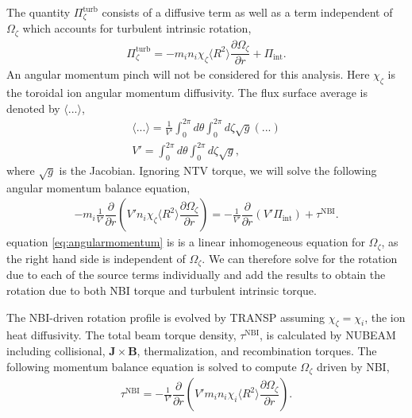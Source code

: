 \documentclass[aip, pop, preprint]{revtex4-1}
\numberwithin{figure}{section}
\numberwithin{equation}{section}
\newcommand{\partder}[2]{\dfrac{\partial  #1}{\partial  #2}} %
\begin{document}
The quantity $\Pi_{\zeta}^{\mathrm{turb}}$ consists of a diffusive term as well as a term independent of $\Omega_{\zeta}$ which accounts for turbulent intrinsic rotation, 
\begin{gather}
\Pi_{\zeta}^{\mathrm{turb}} = -m_i n_i \chi_{\zeta} \langle R^2 \rangle \partder{\Omega_{\zeta}}{r} + \Pi_{\mathrm{int}}.
\end{gather}
An angular momentum pinch will not be considered for this analysis. Here $\chi_{\zeta}$ is the toroidal ion angular momentum diffusivity. The flux surface average is denoted by $\langle ... \rangle$,
\begin{gather}
\langle ... \rangle = \frac{1}{V'} \int_0^{2 \pi} d \theta \int_0^{2 \pi} d \zeta \sqrt{g} (...)
\\ V' = \int_0^{2\pi} d \theta \int_0^{2 \pi} d \zeta \sqrt{g},
\end{gather}
where $\sqrt{g}$ is the Jacobian.
Ignoring NTV torque, we will solve the following angular momentum balance equation,
\begin{gather}
-m_i \frac{1}{V'} \partder{}{r} \left( V' n_i \chi_{\zeta} \langle R^2 \rangle \partder{\Omega_{\zeta}}{r} \right) =  -\frac{1}{V'} \partder{}{r} \left( V' \Pi_{\mathrm{int}} \right) + \tau^{\mathrm{NBI}}.
\label{eq:angularmomentum}
\end{gather}
equation \ref{eq:angularmomentum} is is a linear inhomogeneous equation for $\Omega_{\zeta}$, as the right hand side is independent of $\Omega_{\zeta}$. We can therefore solve for the rotation due to each of the source terms individually and add the results to obtain the rotation due to both NBI torque and turbulent intrinsic torque. 

The NBI-driven rotation profile is evolved by TRANSP assuming $\chi_{\zeta} = \chi_{i}$, the ion heat diffusivity. The total beam torque density, $\tau^{\mathrm{NBI}}$, is calculated by NUBEAM including collisional, $\bm{J} \times \bm{B}$, thermalization, and recombination torques. The following momentum balance equation is solved to compute $\Omega_{\zeta}$ driven by NBI,
\begin{gather}
\tau^{\mathrm{NBI}} = -\frac{1}{V'} \partder{}{r} \left( V' m_i n_i \chi_{i} \langle R^2 \rangle \partder{\Omega_{\zeta}}{r} \right).
\end{gather} 
\end{document}
